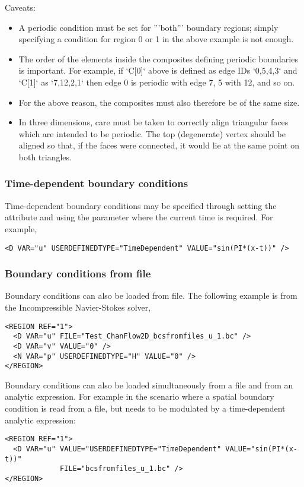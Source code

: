 Caveats:
\begin{itemize}
\item A periodic condition must be set for '''both''' boundary regions; simply
 specifying a condition for region 0 or 1 in the above example is not enough.
\item The order of the elements inside the composites defining periodic
boundaries is important. For example, if `C[0]` above is defined as edge IDs 
`{0,5,4,3}` and `C[1]` as `{7,12,2,1}` then edge 0 is periodic with edge 7, 5 
with 12, and so on.
\item For the above reason, the composites must also therefore be of the same
size.
\item In three dimensions, care must be taken to correctly align triangular
faces which are intended to be periodic. The top (degenerate) vertex should be 
aligned so that, if the faces were connected, it would lie at the same point on 
both triangles.
\end{itemize}

\subsubsection{Time-dependent boundary conditions}
Time-dependent boundary conditions may be specified through setting the
 attribute and using the parameter  where the
current time is required. For example,
\begin{lstlisting}[style=XMLStyle]
<D VAR="u" USERDEFINEDTYPE="TimeDependent" VALUE="sin(PI*(x-t))" />
\end{lstlisting}

\subsubsection{Boundary conditions from file}
Boundary conditions can also be loaded from file. The following example is from
the Incompressible Navier-Stokes solver,
\begin{lstlisting}[style=XMLStyle]
<REGION REF="1">
  <D VAR="u" FILE="Test_ChanFlow2D_bcsfromfiles_u_1.bc" />
  <D VAR="v" VALUE="0" />
  <N VAR="p" USERDEFINEDTYPE="H" VALUE="0" />
</REGION>
\end{lstlisting}

Boundary conditions can also be loaded simultaneously from a file and from an 
analytic expression. For example in the scenario where a spatial boundary 
condition is read from a file, but needs to be modulated by a time-dependent 
analytic expression:
\begin{lstlisting}[style=XMLStyle]
<REGION REF="1">
  <D VAR="u" VALUE="USERDEFINEDTYPE="TimeDependent" VALUE="sin(PI*(x-t))"
             FILE="bcsfromfiles_u_1.bc" />
</REGION>
\end{lstlisting}

